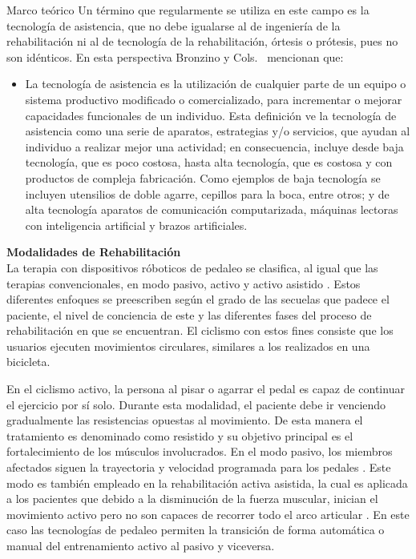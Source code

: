 \begin{thesischapter}{1} {Marco teórico}
    \vspace{10pt}
    Un término que regularmente se utiliza en este campo es la tecnología de asistencia, que no debe igualarse al de ingeniería de la rehabilitación ni al de tecnología de la rehabilitación, órtesis o prótesis, pues no son idénticos. En esta perspectiva Bronzino y Cols.~\cite{enderle2012introduction}  mencionan que:

    \begin{itemize}
        \item  La tecnología de asistencia es la utilización de cualquier parte de un equipo o sistema productivo modificado o comercializado, para incrementar o mejorar capacidades funcionales de un individuo. Esta definición ve
        la tecnología de asistencia como una serie de aparatos, estrategias y/o servicios, que ayudan al individuo a realizar mejor una actividad; en consecuencia, incluye desde baja
        tecnología, que es poco costosa, hasta alta tecnología, que es costosa y con productos de compleja fabricación. Como ejemplos de baja tecnología se incluyen utensilios de doble agarre, cepillos para la boca, entre otros; y de alta tecnología aparatos de comunicación computarizada, máquinas lectoras con inteligencia artificial y brazos artificiales.
    \end{itemize}
    
    \vspace{10pt}
    \textbf{Modalidades de Rehabilitación} \\ 
    La terapia con dispositivos róboticos de pedaleo se clasifica, al igual que las terapias convencionales, en modo pasivo, activo y activo asistido \cite{barclay2019effect}. Estos diferentes enfoques
    se preescriben según el grado de las secuelas que padece el paciente, el nivel de conciencia de este y las diferentes fases del proceso de rehabilitación en que se encuentran. El ciclismo con estos fines consiste que los usuarios ejecuten movimientos circulares, similares a los realizados en una bicicleta.

    \vspace{5pt}
    En el ciclismo activo, la persona al pisar o agarrar el pedal es capaz de continuar el ejercicio por sí solo. Durante esta modalidad, el paciente debe ir venciendo gradualmente
    las resistencias opuestas al movimiento. De esta manera el tratamiento es denominado como resistido y su objetivo principal es el fortalecimiento de los músculos involucrados. En el modo pasivo, los miembros afectados siguen la trayectoria y velocidad programada
    para los pedales \cite{ferreira2020virtual}. Este modo es también empleado en la rehabilitación activa asistida, la cual es aplicada a los pacientes que debido a la disminución de la fuerza muscular,
    inician el movimiento activo pero no son capaces de recorrer todo el arco articular \cite{cruz2009guia}. En este caso las tecnologías de pedaleo permiten la transición de forma automática o
    manual del entrenamiento activo al pasivo y viceversa.


\end{thesischapter}
